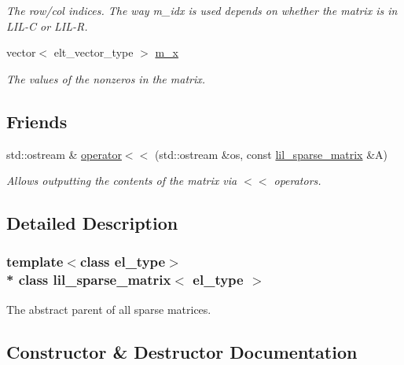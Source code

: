 \begin{DoxyCompactItemize}
\begin{DoxyCompactList}\small\item\em The row/col indices. The way m\+\_\+idx is used depends on whether the matrix is in L\+I\+L-\/C or L\+I\+L-\/R. \end{DoxyCompactList}\item 
vector$<$ elt\+\_\+vector\+\_\+type $>$ \hyperlink{classlil__sparse__matrix_ac2abac5da68172e1e3e21376247643de}{m\+\_\+x}\hypertarget{classlil__sparse__matrix_ac2abac5da68172e1e3e21376247643de}{}\label{classlil__sparse__matrix_ac2abac5da68172e1e3e21376247643de}

\begin{DoxyCompactList}\small\item\em The values of the nonzeros in the matrix. \end{DoxyCompactList}\end{DoxyCompactItemize}
\subsection*{Friends}
\begin{DoxyCompactItemize}
\item 
std\+::ostream \& \hyperlink{classlil__sparse__matrix_a9f5c4b354ab1ce7fd0bf6bb146b1f3c0}{operator$<$$<$} (std\+::ostream \&os, const \hyperlink{classlil__sparse__matrix}{lil\+\_\+sparse\+\_\+matrix} \&A)\hypertarget{classlil__sparse__matrix_a9f5c4b354ab1ce7fd0bf6bb146b1f3c0}{}\label{classlil__sparse__matrix_a9f5c4b354ab1ce7fd0bf6bb146b1f3c0}

\begin{DoxyCompactList}\small\item\em Allows outputting the contents of the matrix via $<$$<$ operators. \end{DoxyCompactList}\end{DoxyCompactItemize}


\subsection{Detailed Description}
\subsubsection*{template$<$class el\+\_\+type$>$\\*
class lil\+\_\+sparse\+\_\+matrix$<$ el\+\_\+type $>$}

The abstract parent of all sparse matrices. 

\subsection{Constructor \& Destructor Documentation}
